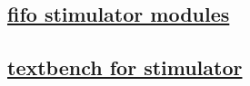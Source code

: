 \documentclass{article}
\begin{document}
  


  \subsection{\href{../files/tm_stim_fifo-v.html}{fifo stimulator modules}}
  \subsection{\href{../files2/tb_fifo-v.html}{textbench for stimulator}}
\end{document}

